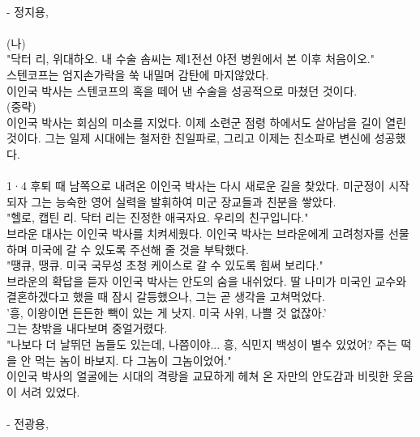 \documentclass[11pt,a4paper]{article}
\begin{document}
\begin{tcolorbox}[passage]
\vspace{4pt} \\{}
- 정지용,  \\{}
\vspace{4pt} \\{}
(나) \\{}
"닥터 리, 위대하오. 내 수술 솜씨는 제1전선 야전 병원에서 본 이후 처음이오." \\{}
스텐코프는 엄지손가락을 쑥 내밀며 감탄에 마지않았다. \\{}
이인국 박사는 스텐코프의 혹을 떼어 낸 수술을 성공적으로 마쳤던 것이다. \\{}
(중략) \\{}
이인국 박사는 회심의 미소를 지었다. 이제 소련군 점령 하에서도 살아남을 길이 열린 것이다. 그는 일제 시대에는 철저한 친일파로, 그리고 이제는 친소파로 변신에 성공했다. \\{}
\vspace{4pt} \\{}
1·4 후퇴 때 남쪽으로 내려온 이인국 박사는 다시 새로운 길을 찾았다. 미군정이 시작되자 그는 능숙한 영어 실력을 발휘하여 미군 장교들과 친분을 쌓았다. \\{}
"헬로, 캡틴 리. 닥터 리는 진정한 애국자요. 우리의 친구입니다." \\{}
브라운 대사는 이인국 박사를 치켜세웠다. 이인국 박사는 브라운에게 고려청자를 선물하며 미국에 갈 수 있도록 주선해 줄 것을 부탁했다. \\{}
"땡큐, 땡큐. 미국 국무성 초청 케이스로 갈 수 있도록 힘써 보리다." \\{}
브라운의 확답을 듣자 이인국 박사는 안도의 숨을 내쉬었다. 딸 나미가 미국인 교수와 결혼하겠다고 했을 때 잠시 갈등했으나, 그는 곧 생각을 고쳐먹었다. \\{}
'흥, 이왕이면 든든한 빽이 있는 게 낫지. 미국 사위, 나쁠 것 없잖아.' \\{}
그는 창밖을 내다보며 중얼거렸다. \\{}
"나보다 더 날뛰던 놈들도 있는데, 나쯤이야... 흥, 식민지 백성이 별수 있었어? 주는 떡을 안 먹는 놈이 바보지. 다 그놈이 그놈이었어." \\{}
이인국 박사의 얼굴에는 시대의 격랑을 교묘하게 헤쳐 온 자만의 안도감과 비릿한 웃음이 서려 있었다. \\{}
\vspace{4pt} \\{}
- 전광용,
\end{tcolorbox}
\vspace{3mm}
\end{document}
